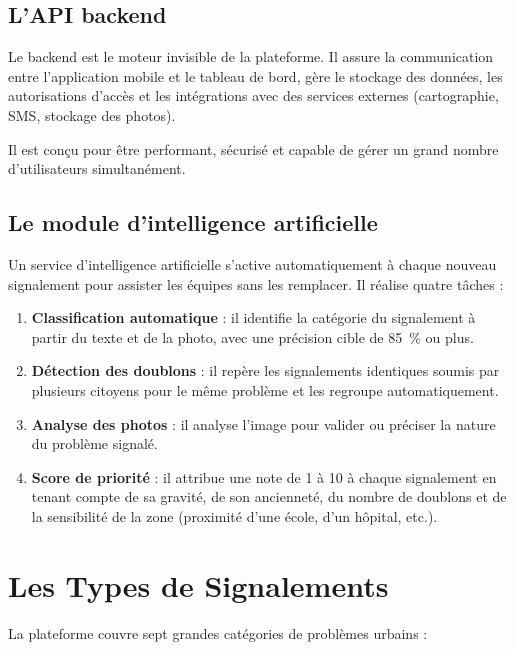 \documentclass[12pt, a4paper]{article}
\begin{document}
\subsection{L'API backend}

Le backend est le moteur invisible de la plateforme. Il assure la communication entre l'application mobile et le tableau de bord, gère le stockage des données, les autorisations d'accès et les intégrations avec des services externes (cartographie, SMS, stockage des photos).

Il est conçu pour être performant, sécurisé et capable de gérer un grand nombre d'utilisateurs simultanément.

\subsection{Le module d'intelligence artificielle}

Un service d'intelligence artificielle s'active automatiquement à chaque nouveau signalement pour assister les équipes sans les remplacer. Il réalise quatre tâches :

\begin{enumerate}[leftmargin=*, label=\textbf{\arabic*.}]
  \item \textbf{Classification automatique} : il identifie la catégorie du signalement à partir du texte et de la photo, avec une précision cible de 85~\% ou plus.
  \item \textbf{Détection des doublons} : il repère les signalements identiques soumis par plusieurs citoyens pour le même problème et les regroupe automatiquement.
  \item \textbf{Analyse des photos} : il analyse l'image pour valider ou préciser la nature du problème signalé.
  \item \textbf{Score de priorité} : il attribue une note de 1 à 10 à chaque signalement en tenant compte de sa gravité, de son ancienneté, du nombre de doublons et de la sensibilité de la zone (proximité d'une école, d'un hôpital, etc.).
\end{enumerate}

\section{Les Types de Signalements}

La plateforme couvre sept grandes catégories de problèmes urbains :
\end{document}
